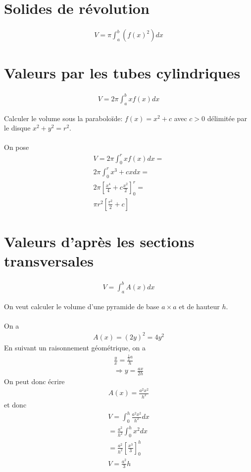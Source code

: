 \section{Solides de révolution}
\begin{eqnarray}
	V=\pi\int_a^b(f(x)^2)dx
\end{eqnarray}

\section{Valeurs par les tubes cylindriques}
\begin{eqnarray}
	V=2\pi\int_a^bxf(x)dx
\end{eqnarray}
\begin{myExample}
	Calculer le volume sous la paraboloïde: $f(x)=x^2+c$ avec $c>0$ délimitée par le disque $x^2+y^2=r^2$.
	\\\\
	On pose
	\begin{eqnarray*}
		V=2\pi\int_0^{r}xf(x)dx=
		\\
		2\pi\int_0^{r}x^3+cxdx=
		\\
		2\pi\left[\frac{x^4}{4}+c\frac{x^2}{2}\right]_0^r=
		\\
		\pi r^2\left[\frac{r^2}{2}+c\right]
	\end{eqnarray*}
	
\end{myExample}

\section{Valeurs d'après les sections transversales}
\begin{eqnarray}
	V=\int_a^bA(x)dx
\end{eqnarray}

\begin{myExample}
	On veut calculer le volume d'une pyramide de base $a \times a$ et de hauteur $h$.
	\\\\
	On a\begin{eqnarray*}
		A(x)=(2y)^2=4y^2
	\end{eqnarray*}
	En suivant un raisonnement géométrique, on a
	\begin{eqnarray*}
		\frac{y}{x}=\frac{\frac{1}{2}a}{h}
		\\
		\Rightarrow
		y=\frac{ax}{2h}
	\end{eqnarray*}
	On peut donc écrire
	\begin{eqnarray*}
		A(x)=\frac{a^2x^2}{h^2}
	\end{eqnarray*}
	et donc
	\begin{eqnarray*}
		V=\int_0^h\frac{a^2x^2}{h^2}dx
		\\
		=\frac{a^2}{h^2}\int_0^hx^2dx
		\\
		=\frac{a^2}{h^2}\left[\frac{x^3}{3}\right]_0^h
		\\
		V=\frac{a^2}{3}h
	\end{eqnarray*}
\end{myExample}

